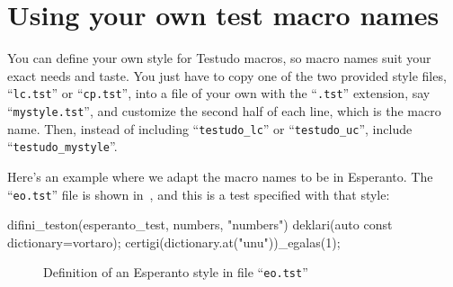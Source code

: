 \documentclass[twoside, a4paper, article]{memoir}
\begin{document}
\chapter{Using your own test macro names}
\label{cha:using-your-own-test-macro-names}

You can define your own style for Testudo macros, so macro names suit your
exact needs and taste.  You just have to copy one of the two provided style
files, ``\texttt{lc.tst}'' or ``\texttt{cp.tst}'', into a file of your own with
the ``\texttt{.tst}'' extension, say ``\texttt{mystyle.tst}'', and customize
the second half of each line, which is the macro name.  Then, instead of
including ``\texttt{testudo\_lc}'' or ``\texttt{testudo\_uc}'', include
``\texttt{testudo\_mystyle}''.

Here's an example where we adapt the macro names to be in Esperanto.  The
``\texttt{eo.tst}'' file is shown in~, and this is a
test specified with that style:
\begin{cpplisting}
difini_teston(esperanto_test, numbers, "numbers") {
  deklari(auto const dictionary=vortaro);
  certigi(dictionary.at("unu"))_egalas(1);
}
\end{cpplisting}

\begin{figure}
  \centering
  \caption{Definition of an Esperanto style in file ``\texttt{eo.tst}''}
  \label{fig:esperanto-style}
\end{figure}

\backmatter
\end{document}
